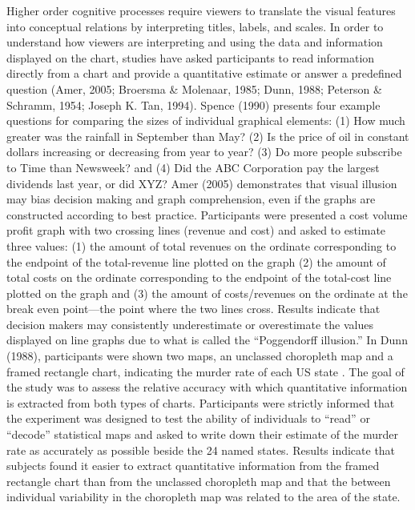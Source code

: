 \documentclass[print]{nuthesis}
\begin{document}
Higher order cognitive processes require viewers to translate the visual features into conceptual relations by interpreting titles, labels, and scales.
In order to understand how viewers are interpreting and using the data and information displayed on the chart, studies have asked participants to read information directly from a chart and provide a quantitative estimate or answer a predefined question (Amer, 2005; Broersma \& Molenaar, 1985; Dunn, 1988; Peterson \& Schramm, 1954; Joseph K. Tan, 1994).
Spence (1990) presents four example questions for comparing the sizes of individual graphical elements: (1) How much greater was the rainfall in September than May? (2) Is the price of oil in constant dollars increasing or decreasing from year to year? (3) Do more people subscribe to Time than Newsweek? and (4) Did the ABC Corporation pay the largest dividends last year, or did XYZ?
Amer (2005) demonstrates that visual illusion may bias decision making and graph comprehension, even if the graphs are constructed according to best practice.
Participants were presented a cost volume profit graph  with two crossing lines (revenue and cost) and asked to estimate three values: (1) the amount of total revenues on the ordinate corresponding to the endpoint of the total-revenue line plotted on the graph (2) the amount of total costs on the ordinate corresponding to the endpoint of the total-cost line plotted on the graph and (3) the amount of costs/revenues on the ordinate at the break even point---the point where the two lines cross.
Results indicate that decision makers may consistently underestimate or overestimate the values displayed on line graphs due to what is called the ``Poggendorff illusion.''
In Dunn (1988), participants were shown two maps, an unclassed choropleth map and a framed rectangle chart, indicating the murder rate of each US state .
The goal of the study was to assess the relative accuracy with which quantitative information is extracted from both types of charts.
Participants were strictly informed that the experiment was designed to test the ability of individuals to ``read'' or ``decode'' statistical maps and asked to write down their estimate of the murder rate as accurately as possible beside the 24 named states.
Results indicate that subjects found it easier to extract quantitative information from the framed rectangle chart than from the unclassed choropleth map and that the between individual variability in the choropleth map was related to the area of the state.
\end{document}
